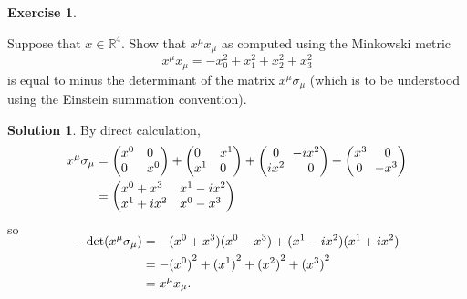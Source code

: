 \documentclass[11pt, a4paper]{report}
\theoremstyle{definition}
\newtheorem{exercise}{Exercise}[part]
\newtheorem{solution}{Solution}[part]
\newenvironment{ex}{\begin{exercise}}{\end{exercise}\pagebreak[1]}
\newenvironment{sol}{\begin{solution}}{\end{solution}\pagebreak[3]}
\newcommand*{\settightmatrix}{\ensuremath\setlength{\arraycolsep}{0.7ex}}
\newenvironment{tightmatrix}
    {\settightmatrix}{}
\begin{document}
\begin{ex}\label{ex:minkowskispacepaulimatrices}

Suppose that $x \in \mathbb{R}^4$. Show that $x^\mu x_\mu$ as computed using the Minkowski metric
\[
    x^\mu x_\mu = -x_0^2 + x_1^2 + x_2^2 + x_3^2
\]
is equal to minus the determinant of the matrix $x^\mu \sigma_\mu$ (which is to be understood using the Einstein summation convention).

\end{ex}

\begin{sol}

By direct calculation,
\begin{align*}
    x^\mu \sigma_\mu &= \begin{pmatrix*}[l]
                            x^0 & 0 \\
                            0   & x^0
                        \end{pmatrix*}
                        + \begin{pmatrix*}[l]
                            0   & x^1 \\
                            x^1 & 0
                          \end{pmatrix*}
                        + \begin{tightmatrix}\begin{pmatrix}
                            0     & -i x^2 \\
                            i x^2 &  \phantom{-} 0
                          \end{pmatrix}\end{tightmatrix}
                        + \begin{tightmatrix}\begin{pmatrix*}[l]
                            x^3    & \phantom{-} 0 \\
                            \, 0   & -x^3
                          \end{pmatrix*}\end{tightmatrix} \\
        &= \begin{pmatrix*}[l]
            x^0 + x^3 & x^1 - ix^2 \\
            x^1 + ix^2 & x^0 - x^3
          \end{pmatrix*}
\end{align*}
so
\begin{align*}
    \SwapAboveDisplaySkip
    -\det(x^\mu \sigma_\mu) &= - (x^0 + x^3) (x^0 - x^3) + (x^1 - ix^2)(x^1 + ix^2) \\
                            &= - {(x^0)}^2 + {(x^1)}^2 + {(x^2)}^2 + {(x^3)}^2 \\
                            &= x^\mu x_\mu.
\end{align*}

\end{sol}
\end{document}

